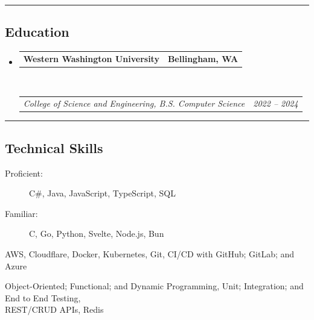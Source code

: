 \documentclass[10pt,letterpaper]{article}
\makeatletter
\newenvironment{indentsection}[1]%
{\begin{list}{}%
	{\setlength{\leftmargin}{#1}}%
	\item[]%
}
{\end{list}}
\newcommand{\headerrow}[2]
{\begin{tabular*}{\linewidth}{l@{\extracolsep{\fill}}r}
	#1 &
	#2 \\
\end{tabular*}}
\makeatother
\begin{document}
\hrule
\subsection*{Education}

\begin{itemize}
  \item
        \headerrow
        {\textbf{Western Washington University}}
        {\textbf{Bellingham, WA}}
        \\
        \headerrow
        {\emph{College of Science and Engineering, B.S. Computer Science}}
        {\emph{2022 -- 2024}}
\end{itemize}

\hrule
\subsection*{Technical Skills}

\begin{indentsection}{\parindent}
  \begin{description*}
    \item[Languages] \hfill
          \begin{description}
            \item[Proficient:] C\#, Java, JavaScript, TypeScript, SQL
            \item[Familiar:] C, Go, Python, Svelte, Node.js, Bun
          \end{description}
    \item[DevOps Tools:] AWS, Cloudflare, Docker, Kubernetes, Git, CI/CD with GitHub; GitLab; and Azure
    \item[Development:] Object-Oriented; Functional; and Dynamic Programming, Unit; Integration; and End to End Testing, \\
          REST/CRUD APIs, Redis
  \end{description*}
\end{indentsection}
\end{document}
